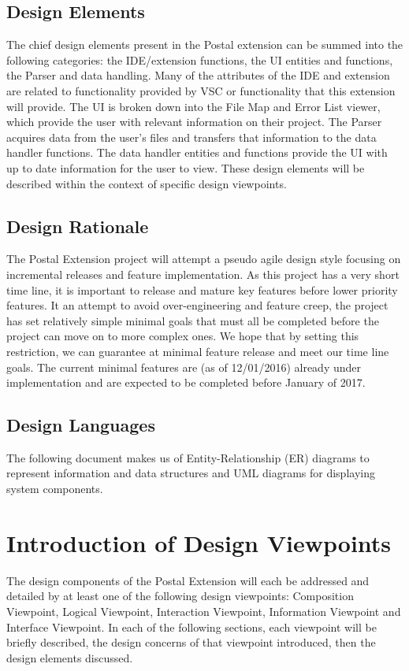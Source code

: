 \documentclass[letterpaper,10pt,titlepage,draftclsnofoot,onecolumn,onesided] {IEEEtran}
\begin{document}
\subsection{Design Elements}
The chief design elements present in the Postal extension can be summed into the following categories: the IDE/extension functions, the UI entities and functions, the Parser and data handling.
Many of the attributes of the IDE and extension are related to functionality provided by VSC or functionality that this extension will provide. 
The UI is broken down into the File Map and Error List viewer, which provide the user with relevant information on their project.
The Parser acquires data from the user's files and transfers that information to the data handler functions.
The data handler entities and functions provide the UI with up to date information for the user to view.
These design elements will be described within the context of specific design viewpoints.

\subsection{Design Rationale}
The Postal Extension project will attempt a pseudo agile design style focusing on incremental releases and feature implementation.
As this project has a very short time line, it is important to release and mature key features before lower priority features. 
It an attempt to avoid over-engineering and feature creep, the project has set relatively simple minimal goals that must all be completed before the project can move on to more complex ones.
We hope that by setting this restriction, we can guarantee at minimal feature release and meet our time line goals.
The current minimal features are (as of 12/01/2016) already under implementation and are expected to be completed before January of 2017.


\subsection{Design Languages}
The following document makes us of Entity-Relationship (ER) diagrams to represent information and data structures and UML diagrams for displaying system components. 

\section{Introduction of Design Viewpoints}
The design components of the Postal Extension will each be addressed and detailed by at least one of the following design viewpoints: Composition Viewpoint, Logical Viewpoint, Interaction Viewpoint, Information Viewpoint and Interface Viewpoint.
In each of the following sections, each viewpoint will be briefly described, the design concerns of that viewpoint introduced, then the design elements discussed.
\end{document}
